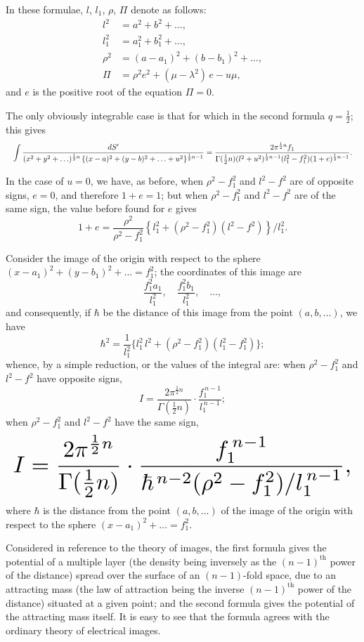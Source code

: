\documentclass[11pt,a4paper]{article}
\theoremstyle{plain}
\begin{document}
In these formulae, $l$, $l_1$, $\rho$, $\Pi$ denote as follows:
\begin{align*}
l^2  &= a^2 + b^2 + \ldots, \\
l_1^2 &= a_1^2 + b_1^2 + \ldots, \\
\rho^2 &= (a-a_1)^2 + (b-b_1)^2 + \ldots, \\
\Pi  &= \rho^2 e^2 + (\mu - \lambda^2)\,e - u\mu,
\end{align*}
and $e$ is the positive root of the equation $\Pi = 0$.

The only obviously integrable case is that for which in the second formula $q = \tfrac{1}{2}$; this gives
\[
\resizebox{\textwidth}{!}{$\displaystyle \int \frac{dS'}{(x^2+y^2+\ldots)^{\frac{1}{2}n}\,\{(x-a)^2 + (y-b)^2 + \ldots + u^2\}^{\frac{1}{2}n-1}} = \frac{2\pi^{\frac{1}{2}n}f_1}{\Gamma(\tfrac{1}{2}n)(l^2+u^2)^{\frac{1}{2}n-1}(l_1^2 - f_1^2)(1+e)^{\frac{1}{2}n-1}}. $}
\]

In the case of $u = 0$, we have, as before, when $\rho^2 - f_1^2$ and $l^2 - f^2$ are of opposite signs, $e = 0$, and therefore $1+e = 1$; but when $\rho^2 - f_1^2$ and $l^2 - f^2$ are of the same sign, the value before found for $e$ gives
\[1 + e = \frac{\rho^2}{\rho^2 - f_1^2}\left\{l_1^2 + (\rho^2 - f_1^2)(l^2 - f^2)\right\}\!\big/\!l_1^2.\]

Consider the image of the origin with respect to the sphere $(x-a_1)^2 + (y-b_1)^2 + \ldots = f_1^2$; the coordinates of this image are
\[\frac{f_1^2 a_1}{l_1^2}, \quad \frac{f_1^2 b_1}{l_1^2}, \quad \ldots,\]
and consequently, if $\hbar$ be the distance of this image from the point $(a,b,\ldots)$, we have
\[\hbar^2 = \frac{1}{l_1^2}\bigl\{l_1^2\,l^2 + (\rho^2 - f_1^2)(l_1^2 - f_1^2)\bigr\};\]
whence, by a simple reduction, or the values of the integral are: when $\rho^2-f_1^2$ and $l^2-f^2$ have opposite signs,
\[I = \frac{2\pi^{\frac{1}{2}n}}{\Gamma(\tfrac{1}{2}n)} \cdot \frac{f_1^{\,n-1}}{l_1^{\,n-1}};\]
when $\rho^2-f_1^2$ and $l^2-f^2$ have the same sign,
\[
\resizebox{\textwidth}{!}{$\displaystyle I = \frac{2\pi^{\frac{1}{2}n}}{\Gamma(\tfrac{1}{2}n)} \cdot \frac{f_1^{\,n-1}}{\hbar^{\,n-2}(\rho^2 - f_1^2)/l_1^{\,n-1}}, $}
\]
where $\hbar$ is the distance from the point $(a,b,\ldots)$ of the image of the origin with respect to the sphere $(x-a_1)^2 + \ldots = f_1^2$.

Considered in reference to the theory of images, the first formula gives the potential of a multiple layer (the density being inversely as the $(n-1)^{\text{th}}$ power of the distance) spread over the surface of an $(n-1)$-fold space, due to an attracting mass (the law of attraction being the inverse $(n-1)^{\text{th}}$ power of the distance) situated at a given point; and the second formula gives the potential of the attracting mass itself. It is easy to see that the formula agrees with the ordinary theory of electrical images.
\end{document}
